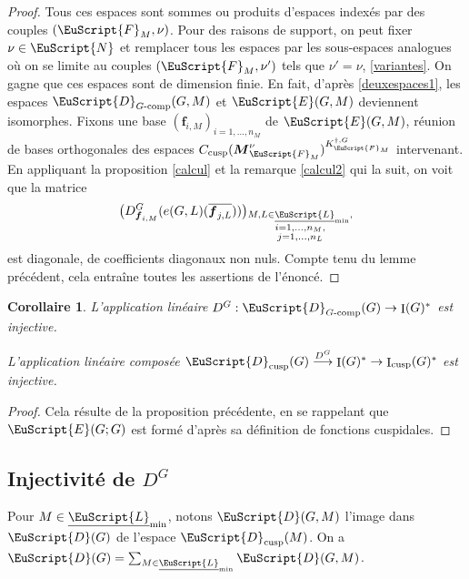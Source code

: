 \documentclass[JEP,XML,SOM,Unicode,francais]{cedram}
\let\mathcal \EuScript
\let\oldenumerate\enumerate
\renewcommand{\enumerate}{\oldenumerate\itemindent0pt}
\newenvironment{enumeratei}
{\bgroup\def\theenumi{\roman{enumi}}\def\theenumii{\arabic{enumii}}\oldenumerate}
{\endenumerate\egroup}
\def\To#1{\mathchoice{\xrightarrow{\textstyle\kern4pt#1\kern3pt}}{\stackrel{#1}{\longrightarrow}}{}{}}
\newcommand{\tcomp}{\textup{-comp}}
\newcommand{\cusp}{\mathrm{cusp}}
\DeclareMathOperator{\rI}{I}
\newcommand{\bmf}{\boldsymbol{f}}
\newcommand{\bM}{\boldsymbol{M}}
\newcommand{\cD}{\mathcal{D}}
\newcommand{\cE}{\mathcal{E}}
\newcommand{\cF}{\mathcal{F}}
\newcommand{\cL}{\mathcal{L}}
\newcommand{\cN}{\mathcal{N}}
\theoremstyle{plain}
\newtheorem*{cor*}{Corollaire}
\theoremstyle{definition}
\begin{document}
\begin{proof}
Tous ces espaces sont sommes ou produits d'espaces indexés par des couples $(\cF_{M},\nu)$. Pour des raisons de support, on peut fixer $\nu\in \cN$ et remplacer tous les espaces par les sous-espaces analogues où on se limite au couples $(\cF_{M},\nu')$ tels que $\nu'=\nu$, \cf \ref{variantes}. On gagne que ces espaces sont de dimension finie. En fait, d'après \eqref{deuxespaces1}, les espaces $\cD_{G\tcomp}(G,M)$ et $\cE(G,M)$ deviennent isomorphes. Fixons une base $(\bmf_{i,M})_{i=1,\dots,n_{M}}$ de $\cE(G,M)$, réunion de bases orthogonales des espaces $C_{\cusp}(\bM^{\nu}_{\cF_{M}})^{K_{\cF_{M}}^{\dag,G}}$ intervenant. En appliquant la proposition \ref{calcul} et la remarque \eqref{calcul2} qui la suit, on voit
que la matrice
\[
\big(D^G_{\bmf_{i,M}}(e(G,L)(\overline{\bmf_{j,L}}))\big)_{\substack{M,L\in \underline{\cL}_{\min},\\
i=1,\dots,n_{M},\\
j=1,\dots,n_{L}}}
\]
est diagonale, de coefficients diagonaux non nuls. Compte tenu du lemme précédent, cela entraîne toutes les assertions de l'énoncé.
\end{proof}

\label{uncorollaire}

\skpt
\begin{cor*}
\begin{enumeratei}
\item\label{uncorollairei}
L'application linéaire $D^G:\cD_{G\tcomp}(G)\to \rI(G)^*$ est injective.

\item\label{uncorollaireii}
L'application linéaire composée $\cD_{\cusp}(G)\To{D^G}\rI(G)^*\to \rI_{\cusp}(G)^*$ est injective.
\end{enumeratei}
\end{cor*}

\begin{proof}
Cela résulte de la proposition précédente, en se rappelant que $\cE(G;G)$ est formé d'après sa définition de fonctions cuspidales.
\end{proof}

\subsection{Injectivité de \texorpdfstring{$D^G$}{DG}}\label{injectivite}
Pour $M\in \underline{\cL}_{\min}$, notons $\cD(G,M)$ l'image dans $\cD(G)$ de
l'espace $\cD_{\cusp}(M)$. On a $\cD(G)=\sum_{M\in \underline{\cL}_{\min}}\cD(G,M)$.
\end{document}
